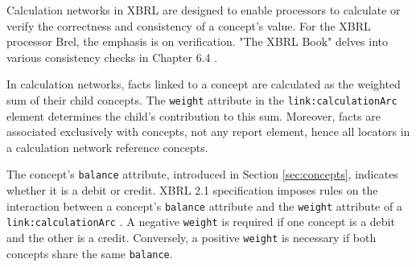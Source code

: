 
Calculation networks in XBRL are designed to enable processors to calculate or verify the correctness and consistency of a concept's value.  
For the XBRL processor Brel, the emphasis is on verification.  
"The XBRL Book" delves into various consistency checks in Chapter 6.4 \cite{fourny2023xbrl}.  

In calculation networks, facts linked to a concept are calculated as the weighted sum of their child concepts.  
The \texttt{weight} attribute in the \texttt{link:calculationArc} element determines the child's contribution to this sum.  
Moreover, facts are associated exclusively with concepts, not any report element,  
hence all locators in a calculation network reference concepts.  

The concept's \texttt{balance} attribute, introduced in Section \ref{sec:concepts}, indicates whether it is a debit or credit.  
XBRL 2.1 specification imposes rules on the interaction between a concept's \texttt{balance} attribute and the \texttt{weight} attribute of a \texttt{link:calculationArc} \cite{xbrl21_concept}.  
A negative \texttt{weight} is required if one concept is a debit and the other is a credit.  
Conversely, a positive \texttt{weight} is necessary if both concepts share the same \texttt{balance}.

